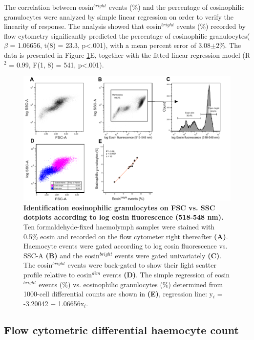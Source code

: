The correlation between eosin$^{bright}$ events (\%) and the percentage of eosinophilic granulocytes were analyzed by simple linear regression on order to verify the linearity of response. The analysis showed that eosin$^{bright}$ events (\%) recorded by flow cytometry significantly predicted the percentage of eosinophilic granulocytes($\beta$ = 1.06656, t(8) = 23.3, p<.001), with a mean percent error of 3.08$\pm{2}$\%. The data is presented in Figure \ref{fig:eosin_exp2}E, together with the fitted linear regression model (R$^{2}$ = 0.99, F(1, 8) = 541, p<.001).

\begin{figure}[H]
    \centering
    \includegraphics[width=1.0\textwidth]{figures/Gating strategy/Eosin exp big font.pdf}
    \caption{\textbf{Identification eosinophilic granulocytes on FSC vs. SSC dotplots according to log eosin fluorescence (518-548 nm).} Ten formaldehyde-fixed haemolymph samples were stained with 0.5\% eosin and recorded on the flow cytometer right thereafter \textbf{(A)}. Haemocyte events were gated according to log eosin fluorescence vs. SSC-A \textbf{(B)} and the eosin$^{bright}$ events were gated univariately \textbf{(C)}. The eosin$^{bright}$ events were back-gated to show their light scatter profile relative to eosin$^{dim}$ events \textbf{(D)}. The simple regression of eosin$^{bright}$ events (\%) vs. eosinophilic granulocytes (\%) determined from 1000-cell differential counts are shown in \textbf{(E)}, regression line: y$_{i}$ = -3.20042 + 1.06656x$_{i}$.}
    \label{fig:eosin_exp2}
\end{figure}

\subsection{Flow cytometric differential haemocyte count}
